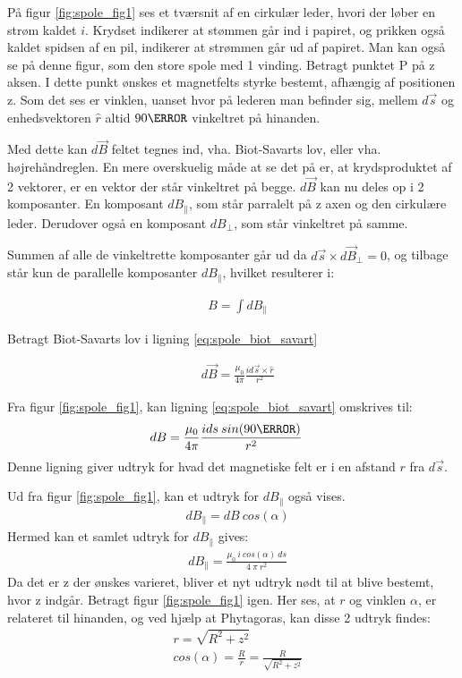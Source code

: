På figur \ref{fig:spole_fig1} ses et tværsnit af en cirkulær leder, hvori der løber en strøm kaldet $i$. Krydset indikerer at stømmen går ind i papiret, og prikken også kaldet spidsen af en pil, indikerer at strømmen går ud af papiret. Man kan også se på denne figur, som den store spole med 1 vinding. Betragt punktet P på z aksen. I dette punkt ønskes et magnetfelts styrke bestemt, afhængig af positionen z. Som det ses er vinklen, uanset hvor på lederen man befinder sig, mellem $d\vec{s}$ og enhedsvektoren $\hat{r}$ altid $90\degree$ vinkeltret på hinanden.

Med dette kan $d\vec{B}$ feltet tegnes ind, vha. Biot-Savarts lov, eller vha. højrehåndreglen. En mere overskuelig måde at se det på er, at krydsproduktet af 2 vektorer, er en vektor der står vinkeltret på begge. 
$d\vec{B}$ kan nu deles op i 2 komposanter. En komposant $dB_\parallel$, som står parralelt på z axen og den cirkulære leder. Derudover også en komposant $dB_\perp$, som står vinkeltret på samme.

Summen af alle de vinkeltrette komposanter går ud da $d\vec{s}\times d\vec{B}_\perp=0$, og tilbage står kun de parallelle komposanter $dB_\parallel$, hvilket resulterer i:

 \begin{align}
 &B=\int dB_\parallel \label{eq:B_field}
 \end{align}

  
  
Betragt Biot-Savarts lov i ligning \ref{eq:spole_biot_savart}

\begin{align}
&d\vec{B}=\frac{\mu_0}{4\pi} \frac{i d\vec{s} \times \hat{r}}{r^2}\label{eq:spole_biot_savart}
\end{align}

Fra figur \ref{fig:spole_fig1}, kan ligning \ref{eq:spole_biot_savart} omskrives til:
\begin{align}
&dB=\frac{\mu_0}{4\pi} \frac{i ds\: sin(90\degree)}{r^2}\label{eq:spole_biot_savart2}
\end{align}
 Denne ligning giver udtryk for hvad det magnetiske felt er i en afstand $r$ fra $d\vec{s}$.
 
Ud fra figur \ref{fig:spole_fig1}, kan et udtryk for $dB_\parallel$ også vises.
 \begin{align}
 	&dB_\parallel=dB\: cos(\alpha)
 \end{align}
Hermed kan et samlet udtryk for $dB_\parallel$ gives: 
\begin{align}
&dB_\parallel=\frac{\mu_0 \:i\: cos(\alpha)\:ds}{4\:\pi\: r^2}
\end{align}
Da det er z der ønskes varieret, bliver et nyt udtryk nødt til at blive bestemt, hvor z indgår. Betragt figur \ref{fig:spole_fig1} igen. Her ses, at $r$ og vinklen $\alpha$, er relateret til hinanden, og ved hjælp at Phytagoras, kan disse 2 udtryk findes:
\begin{align}
&r=\sqrt{R^2+z^2} \\
&cos(\alpha)=\frac{R}{r}=\frac{R}{\sqrt{R^2+z^2}}
\end{align}

